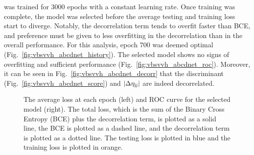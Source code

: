 \ABCDNet was trained for 3000 epochs with a constant learning rate. 
Once training was complete, the model was selected before the average testing and training loss start to diverge. 
Notably, the decorrelation term tends to overfit faster than BCE, and preference must be given to less overfitting in the decorrelation than in the overall performance. 
For this analysis, epoch 700 was deemed optimal (Fig.~\ref{fig:vbsvvh_abcdnet_history}).
The selected model shows no signs of overfitting and sufficient performance (Fig.~\ref{fig:vbsvvh_abcdnet_roc}). 
Moreover, it can be seen in Fig.~\ref{fig:vbsvvh_abcdnet_decorr} that the \ABCDNet discriminant (Fig.~\ref{fig:vbsvvh_abcdnet_score}) and $|\Delta\eta_{\mathrm{j}\mathrm{j}}|$ are indeed decorrelated.

\begin{figure}[htb]
    \centering
    \qquad
    \caption[The average loss at each epoch and ROC curve for the selected \ABCDNet model]{
        The average loss at each epoch (left) and ROC curve for the selected model (right). 
        The total loss, which is the sum of the Binary Cross Entropy (BCE) plus the decorrelation term, is plotted as a solid line, the BCE is plotted as a dashed line, and the decorrelation term is plotted as a dotted line. 
        The testing loss is plotted in blue and the training loss is plotted in orange. 
    }
    \label{fig:vbsvvh_abcdnet_perf}
\end{figure}

